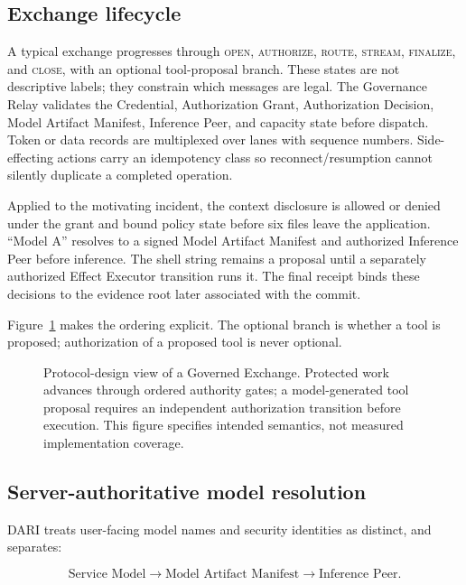 \documentclass[10pt]{article}
\begin{document}
\subsection{Exchange lifecycle}

A typical exchange progresses through \textsc{open}, \textsc{authorize}, \textsc{route}, \textsc{stream}, \textsc{finalize}, and \textsc{close}, with an optional tool-proposal branch. These states are not descriptive labels; they constrain which messages are legal. The Governance Relay validates the Credential, Authorization Grant, Authorization Decision, Model Artifact Manifest, Inference Peer, and capacity state before dispatch. Token or data records are multiplexed over lanes with sequence numbers. Side-effecting actions carry an idempotency class so reconnect/resumption cannot silently duplicate a completed operation.

Applied to the motivating incident, the context disclosure is allowed or denied under the grant and bound policy state before six files leave the application. ``Model A'' resolves to a signed Model Artifact Manifest and authorized Inference Peer before inference. The shell string remains a proposal until a separately authorized Effect Executor transition runs it. The final receipt binds these decisions to the evidence root later associated with the commit.

Figure~\ref{fig:lifecycle} makes the ordering explicit. The optional branch is whether a tool is proposed; authorization of a proposed tool is never optional.

\begin{figure}[H]
  \centering
  
  \caption{Protocol-design view of a Governed Exchange. Protected work advances through ordered authority gates; a model-generated tool proposal requires an independent authorization transition before execution. This figure specifies intended semantics, not measured implementation coverage.}
  \label{fig:lifecycle}
\end{figure}

\subsection{Server-authoritative model resolution}

DARI treats user-facing model names and security identities as distinct, and separates:

\begin{equation*}
\text{Service Model} \rightarrow \text{Model Artifact Manifest} \rightarrow \text{Inference Peer}.
\end{equation*}
\end{document}
